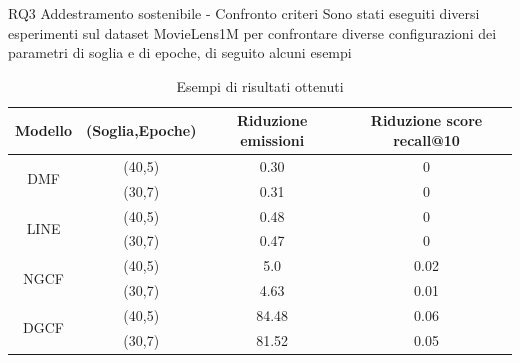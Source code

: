 \begin{frame}{RQ3 Addestramento sostenibile - Confronto criteri}
    Sono stati eseguiti diversi esperimenti sul dataset MovieLens1M per confrontare diverse configurazioni dei parametri di soglia e di epoche, di seguito alcuni esempi\\
    \begin{table}[H]
        \centering
        \begin{tabular}{|c|c|c|c|}
            \hline
            \textbf{Modello} & \textbf{(Soglia,Epoche)} & \textbf{Riduzione emissioni} & \textbf{Riduzione score recall@10} \\ \hline
            \multirow{2}{*}{DMF} & (40,5) & 0.30 & 0 \\ \cline{2-4}
                                 & (30,7) &  0.31 & 0 \\ \hline
            \multirow{2}{*}{LINE} & (40,5) & 0.48 & 0 \\ \cline{2-4}
                                  & (30,7) & 0.47 & 0 \\ \hline
            \multirow{2}{*}{NGCF} & (40,5) & 5.0 & 0.02 \\ \cline{2-4}
                                  & (30,7) &  4.63 & 0.01 \\ \hline
            \multirow{2}{*}{DGCF} & (40,5) & 84.48 & 0.06 \\ \cline{2-4}
                                  & (30,7) & 81.52 &  0.05 \\ \hline
        \end{tabular}
        \caption{Esempi di risultati ottenuti}
    \end{table}
\end{frame}


